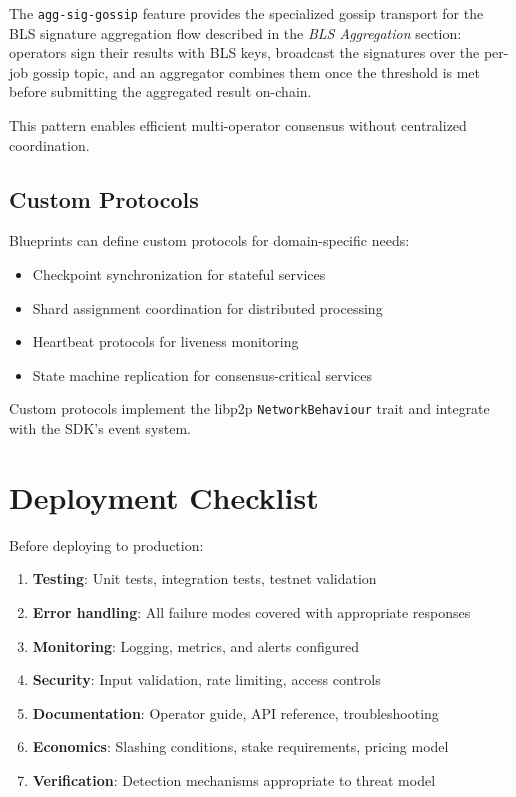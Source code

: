 \documentclass[11pt,a4paper]{article}
\begin{document}
The \texttt{agg-sig-gossip} feature provides the specialized gossip transport for the BLS signature aggregation flow described in the \emph{BLS Aggregation} section: operators sign their results with BLS keys, broadcast the signatures over the per-job gossip topic, and an aggregator combines them once the threshold is met before submitting the aggregated result on-chain.

This pattern enables efficient multi-operator consensus without centralized coordination.

\subsection{Custom Protocols}

Blueprints can define custom protocols for domain-specific needs:
\begin{itemize}[noitemsep]
    \item Checkpoint synchronization for stateful services
    \item Shard assignment coordination for distributed processing
    \item Heartbeat protocols for liveness monitoring
    \item State machine replication for consensus-critical services
\end{itemize}

Custom protocols implement the libp2p \texttt{NetworkBehaviour} trait and integrate with the SDK's event system.

\section{Deployment Checklist}

Before deploying to production:

\begin{enumerate}[noitemsep]
    \item \textbf{Testing}: Unit tests, integration tests, testnet validation
    \item \textbf{Error handling}: All failure modes covered with appropriate responses
    \item \textbf{Monitoring}: Logging, metrics, and alerts configured
    \item \textbf{Security}: Input validation, rate limiting, access controls
    \item \textbf{Documentation}: Operator guide, API reference, troubleshooting
    \item \textbf{Economics}: Slashing conditions, stake requirements, pricing model
    \item \textbf{Verification}: Detection mechanisms appropriate to threat model
\end{enumerate}
\end{document}
